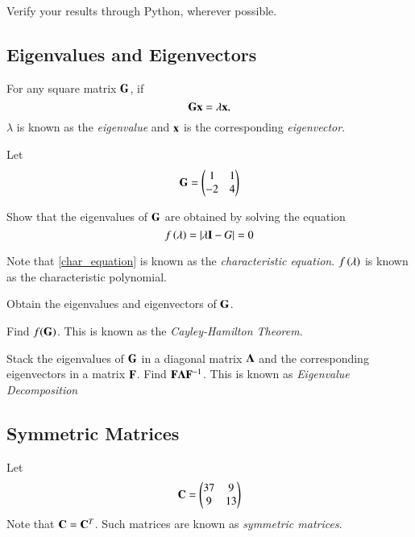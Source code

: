 Verify your results through Python, wherever possible.

\subsection{Eigenvalues and Eigenvectors}
For any square matrix $\mathbf{G}$, if
%
\begin{equation}
\mathbf{G}\mathbf{x} = \lambda \mathbf{x},
\end{equation}
%
$\lambda$ is known as the {\em eigenvalue} and $\mathbf{x}$ is the corresponding {\em eigenvector}.

Let
%
\begin{equation}
\mathbf{G} = \begin{pmatrix}
1 & 1\\-2 & 4
\end{pmatrix}
\end{equation}
\begin{problem}
Show that the eigenvalues of $\mathbf{G}$ are obtained by solving the equation
%
\begin{equation}
\label{char_equation}
f\left(\lambda\right)=\left\vert\lambda \mathbf{I}- G\right\vert = 0
\end{equation}
%
\end{problem}
Note that \eqref{char_equation} is known as the {\em characteristic equation}.  $f\left(\lambda\right)$ is known as the characteristic polynomial.

\begin{problem}
	Obtain the eigenvalues and eigenvectors of $\mathbf{G}$.
\end{problem}
\begin{problem}
	Find $f(\mathbf{G})$.  This is known as the {\em Cayley-Hamilton Theorem}.
\end{problem}


\begin{problem}
	Stack the eigenvalues of $\mathbf{G}$ in a diagonal matrix $\mathbf{\Lambda}$ and the corresponding eigenvectors in a matrix $\mathbf{F}$.  Find $\mathbf{F}\mathbf{\Lambda}\mathbf{F}^{-1}$.  This is known as {\em Eigenvalue Decomposition}
\end{problem}
%

\subsection{Symmetric Matrices}
Let 
%
\begin{equation}
\mathbf{C} = \begin{pmatrix}
37 & 9 \\9 & 13
\end{pmatrix}
\end{equation}
%
Note that $\mathbf{C} = \mathbf{C}^T$.  Such matrices are known as {\em symmetric matrices}.

